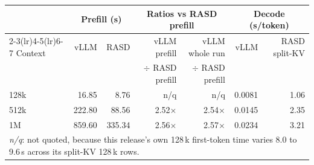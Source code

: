 \begin{tabular}{lrrrrrr}
\toprule
 & \multicolumn{2}{c}{Prefill (s)} & \multicolumn{2}{c}{Ratios vs RASD prefill} & \multicolumn{2}{c}{Decode (s/token)} \\
\cmidrule(lr){2-3}\cmidrule(lr){4-5}\cmidrule(lr){6-7}
Context & vLLM & RASD & vLLM prefill & vLLM whole run & vLLM & RASD split-KV \\
 & & & $\div$ RASD prefill & $\div$ RASD prefill & & \\
\midrule
128k & 16.85 & 8.76 & n/q & n/q & 0.0081 & 1.06 \\
512k & 222.80 & 88.56 & 2.52$\times$ & 2.54$\times$ & 0.0145 & 2.35 \\
1M & 859.60 & 335.34 & 2.56$\times$ & 2.57$\times$ & 0.0234 & 3.21 \\
\midrule
\multicolumn{7}{l}{\footnotesize \emph{n/q}: not quoted, because this release's own 128\,k first-token time varies 8.0 to 9.6\,s across its split-KV 128\,k rows.} \\
\bottomrule
\end{tabular}
